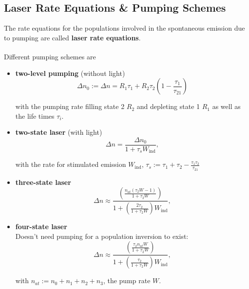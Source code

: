\documentclass{article}
\newcommand{\lr}[1]{\left(#1\right)}
\begin{document}
\subsection{Laser Rate Equations \& Pumping Schemes}
The rate equations for the populations involved in the spontaneous emission due to pumping are called \textbf{laser rate equations}.\\
\\
Different pumping schemes are
	\begin{itemize}
		\item \textbf{two-level pumping} (without light)
			\begin{equation}
				\Delta n_0 := \Delta n = R_1\tau_1 + R_2\tau_2 \lr{ 1 - \frac{\tau_1}{\tau_{21}} }
			\end{equation}
		
		with the pumping rate filling state 2 $R_2$ and depleting state 1 $R_1$ as well as the life times $\tau_i$.
		
		
		\item \textbf{two-state laser} (with light)\\
			\begin{equation}
				\Delta n = \frac{ \Delta n_0 }{ 1 + \tau_s W_\text{ind} },
			\end{equation}
		
		with the rate for stimulated emission $W_\text{ind}$, $\tau_s := \tau_1 + \tau_2 - \frac{\tau_1\tau_2}{\tau_{21}}$
		
		
		\item \textbf{three-state laser}\\
			\begin{equation}
				\Delta n \approx \frac{ \lr{ \frac{n_{at}(\tau_2 W - 1)}{ 1 + \tau_2 W } } }{ 1 + \lr{ \frac{2\tau_2}{ 1 + \tau_2 W } } W_\text{ind} },
			\end{equation}
		
		
		
		\item \textbf{four-state laser}\\
		Doesn't need pumping for a population inversion to exist:
			\begin{equation}
				\Delta n \approx \frac{ \lr{ \frac{\tau_2 n_{at} W }{ 1 + \tau_2 W } } }{ 1 + \lr{ \frac{\tau_2}{ 1 + \tau_2 W } } W_\text{ind} },
			\end{equation}
		
		with $n_{at} := n_0 + n_1 + n_2 + n_3$, the pump rate $W$.
	\end{itemize}
\end{document}
